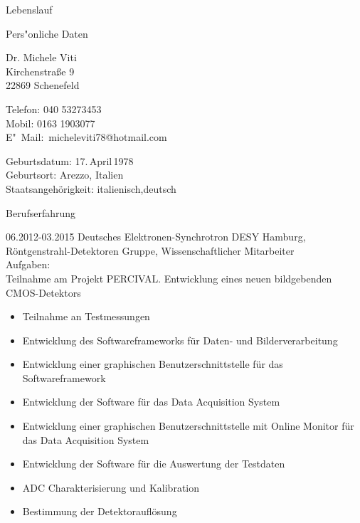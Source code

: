 \documentclass[11pt,a4paper]{scrartcl}
\begin{document}
\begin{cv}{Lebenslauf}
  \begin{cvlist}{Pers"onliche Daten}
  \item Dr. Michele Viti\\
    Kirchenstra{\ss}e 9\\
    22869 Schenefeld
  \item Telefon: 040 53273453\\
    Mobil: 0163 1903077\\
    E"~Mail:~micheleviti78@hotmail.com
  \item Geburtsdatum: 17.\,April\,1978\\
    Geburtsort: Arezzo, Italien\\
    Staatsangeh\"origkeit: italienisch,deutsch 
  \end{cvlist}
  
  \begin{cvlist}{Berufserfahrung}
  
  \item

  \item[06.2012-03.2015] Deutsches Elektronen-Synchrotron DESY Hamburg,
    R{\"o}ntgenstrahl-Detektoren Gruppe, Wissenschaftlicher Mitarbeiter\\

    Aufgaben:\\
    
    Teilnahme am Projekt PERCIVAL. Entwicklung eines neuen 
    bildgebenden CMOS-Detektors
    \begin{itemize}
    \item Teilnahme an Testmessungen
    \item Entwicklung des Softwareframeworks f{\"u}r Daten- und
      Bilderverarbeitung 
    \item Entwicklung einer graphischen Benutzerschnittstelle f{\"u}r  das Softwareframework
    \item Entwicklung der Software f{\"u}r das Data Acquisition
      System
    \item Entwicklung einer graphischen Benutzerschnittstelle mit Online
      Monitor f{\"u}r das Data Acquisition System
    \item Entwicklung der Software f{\"u}r die Auswertung der Testdaten
    \item ADC Charakterisierung und Kalibration
    \item Bestimmung der Detektoraufl{\"o}sung 
    \end{itemize}
      

\end{cvlist}
\end{cv}
\end{document}
